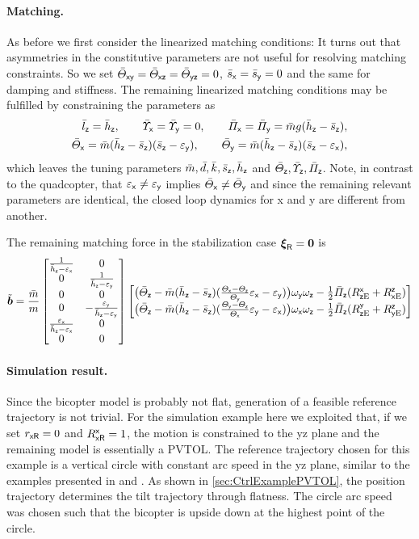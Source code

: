 \paragraph{Matching.}
As before we first consider the linearized matching conditions:
It turns out that asymmetries in the constitutive parameters are not useful for resolving matching constraints.
So we set $\Jcxy=\Jcxz=\Jcyz=0$, $\scx=\scy=0$ and the same for damping and stiffness.
The remaining linearized matching conditions may be fulfilled by constraining the parameters as
\begin{subequations}
\begin{align} 
 \lcz = \hcz,
\qquad
 \sigcx = \sigcy = 0,
\qquad
 \kapcx = \kapcy = \mc \gravityAccConst (\hcz-\scz),
\\
 \Jcx = \mc (\hcz-\scz)(\scz-\epsy),
\qquad
 \Jcy = \mc(\hcz-\scz) (\scz-\epsx),
\end{align}
\end{subequations}
which leaves the tuning parameters $\mc, \dc, \kc, \scz, \hcz$ and $\Jcz, \sigcz, \kapcz$.
Note, in contrast to the quadcopter, that $\epsx \neq \epsy$ implies $\Jcx \neq \Jcy$ and since the remaining relevant parameters are identical, the closed loop dynamics for x and y are different from another.

The remaining matching force in the stabilization case $\sysVelR = \tuple{0}$ is
\begin{align}
 \tilde{\sysForce} = \frac{\mc}{m}
 \begin{bmatrix} \frac{1}{\hcz-\epsx} & 0 \\ 0 & \frac{1}{\hcz-\epsy} \\ 0 & 0 \\ 0 & -\frac{\epsy}{\hcz-\epsy} \\ \frac{\epsx}{\hcz-\epsx} & 0 \\ 0 & 0 \end{bmatrix}
 \begin{bmatrix}
  \big( \Jcz - \mc(\hcz-\scz) (\tfrac{\Jx-\Jz}{\Jy}\epsx - \epsy) \big) \wy\wz - \tfrac{1}{2} \kapcz (\RExz+\REzx) \\
  \big( \Jcz - \mc(\hcz-\scz) (\tfrac{\Jy-\Jz}{\Jx}\epsy - \epsx) \big) \wx\wz - \tfrac{1}{2} \kapcz (\REyz+\REzy)
 \end{bmatrix}
\end{align}

\paragraph{Simulation result.}
Since the bicopter model is probably not flat, generation of a feasible reference trajectory is not trivial. 
For the simulation example here we exploited that, if we set $\rRx = 0$ and $\RRxx=1$, the motion is constrained to the yz plane and the remaining model is essentially a PVTOL.
The reference trajectory chosen for this example is a vertical circle with constant arc speed in the yz plane, similar to the examples presented in \cite{Konz:AT} and \cite{Konz:GaussTrackingControl}.
As shown in \autoref{sec:CtrlExamplePVTOL}, the position trajectory determines the tilt trajectory through flatness.
The circle arc speed was chosen such that the bicopter is upside down at the highest point of the circle.

